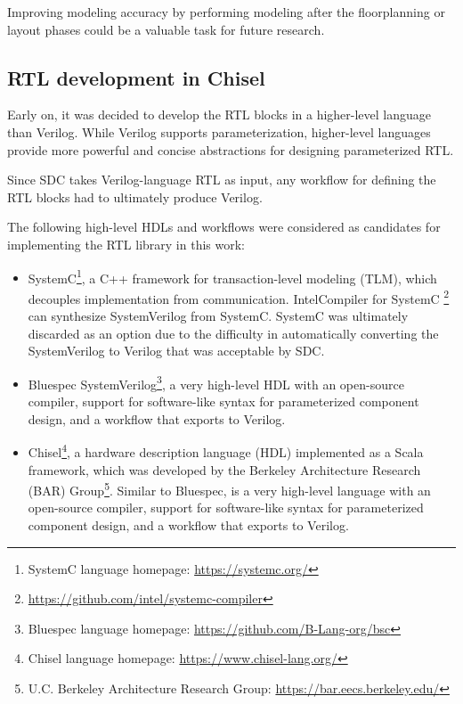 Improving modeling accuracy by performing modeling after the floorplanning or layout phases could be a valuable task for future research.

\subsection{RTL development in Chisel}

Early on, it was decided to develop the RTL blocks in a higher-level language than Verilog. While Verilog supports parameterization, higher-level languages provide more powerful and concise abstractions for designing parameterized RTL. 

Since SDC takes Verilog-language RTL as input, any workflow for defining the RTL blocks had to ultimately produce Verilog.

The following high-level HDLs and workflows were considered as candidates for implementing the RTL library in this work:

\begin{itemize}
    \item SystemC\cite{systemc}\footnote{SystemC language homepage: \url{https://systemc.org/}}, a C++ framework for transaction-level modeling (TLM)\cite{systemc}, which decouples implementation from communication. Intel\textregistered Compiler for SystemC \footnote{\url{https://github.com/intel/systemc-compiler}} can synthesize SystemVerilog from SystemC. SystemC was ultimately discarded as an option due to the difficulty in automatically converting the SystemVerilog to Verilog that was acceptable by SDC.
    \item Bluespec SystemVerilog\cite{bluespec}\footnote{Bluespec language homepage: \url{https://github.com/B-Lang-org/bsc}}, a very high-level HDL with an open-source compiler, support for software-like syntax for parameterized component design, and a workflow that exports to Verilog.
    \item Chisel\cite{chisel}\footnote{Chisel language homepage: \url{https://www.chisel-lang.org/}}, a hardware description language (HDL) implemented as a Scala framework, which was developed by the Berkeley Architecture Research (BAR) Group\footnote{U.C. Berkeley Architecture Research Group: \url{https://bar.eecs.berkeley.edu/}}. Similar to Bluespec, is a very high-level language with an open-source compiler, support for software-like syntax for parameterized component design, and a workflow that exports to Verilog.
\end{itemize}

